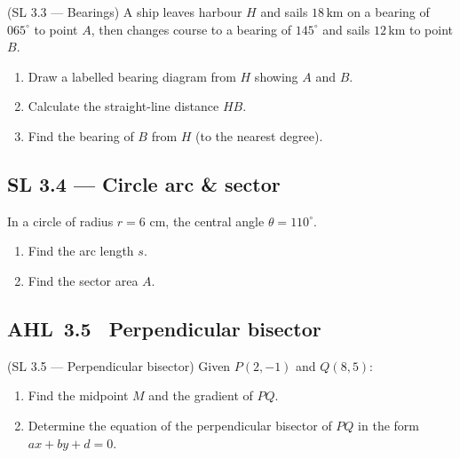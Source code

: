 \documentclass[11pt]{article}
\def\textbf#1{#1}%
\newcommand{\tocsubsection}[1]{\subsection{#1}}
\newcounter{question}
\begin{document}
\begin{question}
\textbf{(SL 3.3 — Bearings)} A ship leaves harbour $H$ and sails $18\,\text{km}$ on a bearing of $065^\circ$ to point $A$, then changes course to a bearing of $145^\circ$ and sails $12\,\text{km}$ to point $B$. 
\begin{enumerate}
  \item Draw a labelled bearing diagram from $H$ showing $A$ and $B$.
  \item Calculate the straight-line distance $HB$.
  \item Find the bearing of $B$ from $H$ (to the nearest degree).
\end{enumerate}

\end{question}



\tocsubsection{SL 3.4 — Circle arc \& sector}
\begin{question}
In a circle of radius $r=6\text{ cm}$, the central angle $\theta=110^\circ$.
\begin{enumerate}
  \item Find the arc length $s$.
  \item Find the sector area $A$.
\end{enumerate}
\begin{center}
\end{center}
\end{question}


\tocsubsection{AHL 3.5 \; Perpendicular bisector}
\begin{question}
\textbf{(SL 3.5 — Perpendicular bisector)} Given $P(2,-1)$ and $Q(8,5)$:
\begin{enumerate}
  \item Find the midpoint $M$ and the gradient of $PQ$.
  \item Determine the equation of the perpendicular bisector of $PQ$ in the form $ax+by+d=0$.
\end{enumerate}
\begin{center}
\end{center}
\end{question}
\end{document}
